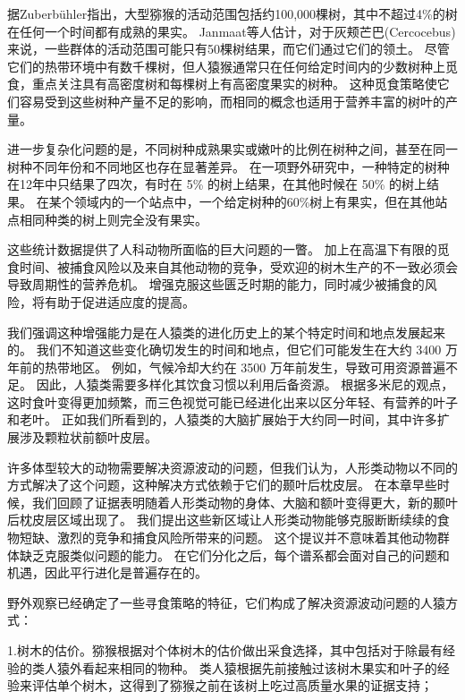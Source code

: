 据Zuberbühler\cite{zuberbuhler2010foraging}指出，大型猕猴的活动范围包括约100,000棵树，其中不超过4\%的树在任何一个时间都有成熟的果实。
Janmaat等人\cite{janmaat2006primates}估计，对于灰颊芒巴(Cercocebus)来说，一些群体的活动范围可能只有50棵树结果，而它们通过它们的领土。
尽管它们的热带环境中有数千棵树，但人猿猴通常只在任何给定时间内的少数树种上觅食，重点关注具有高密度树和每棵树上有高密度果实的树种\cite{janson1988food,eckardt2004cooperation}。
这种觅食策略使它们容易受到这些树种产量不足的影响，而相同的概念也适用于营养丰富的树叶的产量。


进一步复杂化问题的是，不同树种成熟果实或嫩叶的比例在树种之间，甚至在同一树种不同年份和不同地区也存在显著差异。
在一项野外研究中，一种特定的树种在12年中只结果了四次，有时在 5\% 的树上结果，在其他时候在 50\% 的树上结果。
在某个领域内的一个站点中，一个给定树种的60\%树上有果实，但在其他站点相同种类的树上则完全没有果实\cite{chapman1999fruit}。


这些统计数据提供了人科动物所面临的巨大问题的一瞥。
加上在高温下有限的觅食时间、被捕食风险以及来自其他动物的竞争，受欢迎的树木生产的不一致必须会导致周期性的营养危机。
增强克服这些匮乏时期的能力，同时减少被捕食的风险，将有助于促进适应度的提高。


我们强调这种增强能力是在人猿类的进化历史上的某个特定时间和地点发展起来的。
我们不知道这些变化确切发生的时间和地点，但它们可能发生在大约 3400 万年前的热带地区。
例如，气候冷却大约在 3500 万年前发生，导致可用资源普遍不足。
因此，人猿类需要多样化其饮食习惯以利用后备资源。
根据多米尼的观点\cite{dominy2004fruits}，这时食叶变得更加频繁\cite{kirk2001diets}，而三色视觉可能已经进化出来以区分年轻、有营养的叶子和老叶。
正如我们所看到的，人猿类的大脑扩展始于大约同一时间，其中许多扩展涉及颗粒状前额叶皮层。


许多体型较大的动物需要解决资源波动的问题，但我们认为，人形类动物以不同的方式解决了这个问题，这种解决方式依赖于它们的颞叶后枕皮层。
在本章早些时候，我们回顾了证据表明随着人形类动物的身体、大脑和额叶变得更大，新的颞叶后枕皮层区域出现了。
我们提出这些新区域让人形类动物能够克服断断续续的食物短缺、激烈的竞争和捕食风险所带来的问题。
这个提议并不意味着其他动物群体缺乏克服类似问题的能力。
在它们分化之后，每个谱系都会面对自己的问题和机遇，因此平行进化是普遍存在的。


野外观察已经确定了一些寻食策略的特征，它们构成了解决资源波动问题的人猿方式：\par

1.树木的估价。猕猴根据对个体树木的估价做出采食选择，其中包括对于除最有经验的类人猿外看起来相同的物种\cite{zuberbuhler2010foraging}。
类人猿根据先前接触过该树木果实和叶子的经验来评估单个树木，这得到了猕猴之前在该树上吃过高质量水果的证据支持\cite{janmaat2006primates}；\par

